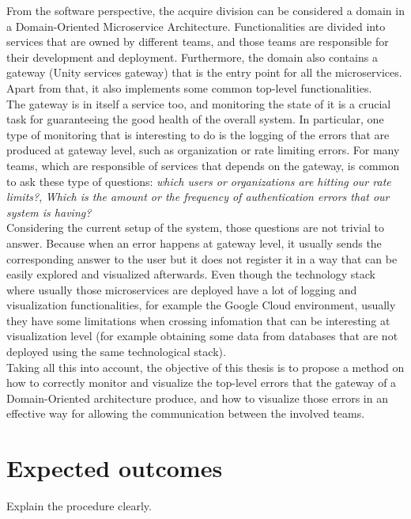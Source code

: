 \documentclass[12pt]{article}
\begin{document}
From the software perspective, the acquire division can be considered a domain in a Domain-Oriented Microservice Architecture. Functionalities are divided into services that are owned by different teams, and those teams are responsible for their development and deployment. Furthermore, the domain also contains a gateway (Unity services gateway) that is the entry point for all the microservices. Apart from that, it also implements some common top-level functionalities.\\

The gateway is in itself a service too, and monitoring the state of it is a crucial task for guaranteeing the good health of the overall system. In particular, one type of monitoring that is interesting to do is the logging of the errors that are produced at gateway level, such as organization or rate limiting errors. For many teams, which are responsible of services that depends on the gateway, is common to ask these type of questions: \textit{which users or organizations are hitting our rate limits?}, \textit{Which is the amount or the frequency of authentication errors that our system is having?}\\

Considering the current setup of the system, those questions are not trivial to answer. Because when an error happens at gateway level, it usually sends the corresponding answer to the user but it does not register it in a way that can be easily explored and visualized afterwards. Even though the technology stack where usually those microservices are deployed have a lot of logging and visualization functionalities, for example the Google Cloud environment, usually they have some limitations when crossing infomation that can be interesting at visualization level (for example obtaining some data from databases that are not deployed using the same technological stack).\\ 

Taking all this into account, the objective of this thesis is to propose a method on how to correctly monitor and visualize the top-level errors that the gateway of a Domain-Oriented architecture produce, and how to visualize those errors in an effective way for allowing the communication between the involved teams.

\section{Expected outcomes}

Explain the procedure clearly.
\end{document}
